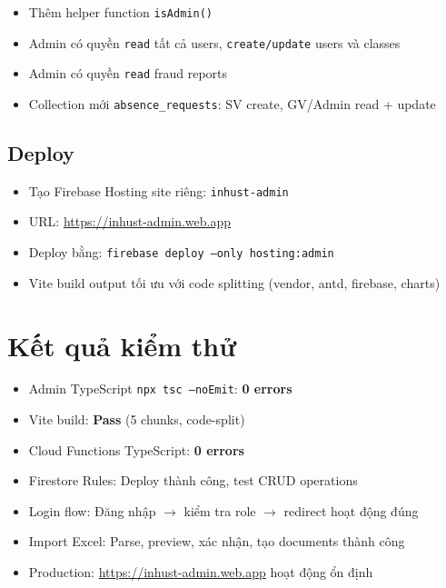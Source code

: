 \documentclass{article}
\begin{document}
\begin{itemize}[leftmargin=1.5em]
  \item Thêm helper function \texttt{isAdmin()}
  \item Admin có quyền \texttt{read} tất cả users, \texttt{create/update} users và classes
  \item Admin có quyền \texttt{read} fraud reports
  \item Collection mới \texttt{absence\_requests}: SV create, GV/Admin read + update
\end{itemize}

\subsection{Deploy}

\begin{itemize}[leftmargin=1.5em]
  \item Tạo Firebase Hosting site riêng: \texttt{inhust-admin}
  \item URL: \url{https://inhust-admin.web.app}
  \item Deploy bằng: \texttt{firebase deploy --only hosting:admin}
  \item Vite build output tối ưu với code splitting (vendor, antd, firebase, charts)
\end{itemize}

\section{Kết quả kiểm thử}

\begin{itemize}[leftmargin=1.5em]
  \item Admin TypeScript \texttt{npx tsc --noEmit}: \textcolor{statusgreen}{\textbf{0 errors}}
  \item Vite build: \textcolor{statusgreen}{\textbf{Pass}} (5 chunks, code-split)
  \item Cloud Functions TypeScript: \textcolor{statusgreen}{\textbf{0 errors}}
  \item Firestore Rules: Deploy thành công, test CRUD operations
  \item Login flow: Đăng nhập $\rightarrow$ kiểm tra role $\rightarrow$ redirect hoạt động đúng
  \item Import Excel: Parse, preview, xác nhận, tạo documents thành công
  \item Production: \url{https://inhust-admin.web.app} hoạt động ổn định
\end{itemize}
\end{document}
